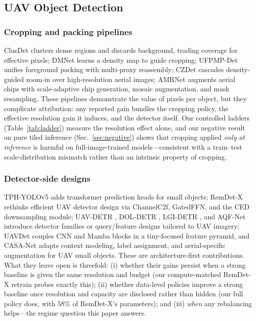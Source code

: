 \documentclass[journal]{IEEEtran}
\newcommand{\remdet}{RemDet-X}
\begin{document}
\subsection{UAV Object Detection}
\subsubsection{Cropping and packing pipelines}
ClusDet \cite{clusdet} clusters dense regions and discards background, trading coverage for effective pixels; DMNet \cite{dmnet} learns a density map to guide cropping; UFPMP-Det \cite{ufpmp} unifies foreground packing with multi-proxy reassembly; CZDet \cite{czdet} cascades density-guided zoom-in over high-resolution aerial images; AMRNet \cite{amrnet} augments aerial chips with scale-adaptive chip generation, mosaic augmentation, and mask resampling. These pipelines demonstrate the value of pixels per object, but they complicate attribution: any reported gain bundles the cropping policy, the effective resolution gain it induces, and the detector itself. Our controlled ladders (Table~\ref{tab:ladder}) measure the resolution effect alone, and our negative result on pure tiled inference (Sec.~\ref{sec:negative}) shows that cropping applied \emph{only at inference} is harmful on full-image-trained models---consistent with a train--test scale-distribution mismatch rather than an intrinsic property of cropping.
\subsubsection{Detector-side designs}
TPH-YOLOv5 \cite{tph} adds transformer prediction heads for small objects; \remdet{} \cite{remdet} rethinks efficient UAV detector design via ChannelC2f, GatedFFN, and the CED downsampling module; UAV-DETR \cite{uavdetr}, DOL-DETR \cite{doldetr}, LGI-DETR \cite{lgidetr}, and AQF-Net \cite{aqfnet} introduce detector families or query/feature designs tailored to UAV imagery; UAVDet \cite{uavdetmamba} couples CNN and Mamba blocks in a tiny-focused feature pyramid, and CASA-Net \cite{casanet} adapts context modeling, label assignment, and aerial-specific augmentation for UAV small objects. These are architecture-first contributions. What they leave open is threefold: (i) whether their gains persist when a strong baseline is given the same resolution and budget (our compute-matched \remdet{} retrain probes exactly this); (ii) whether data-level policies improve a strong baseline once resolution and capacity are disclosed rather than hidden (our full policy does, with $58\%$ of \remdet{}'s parameters); and (iii) \emph{when} any rebalancing helps---the regime question this paper answers.
\end{document}
